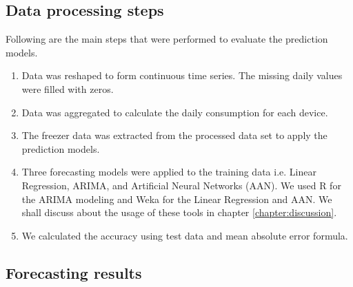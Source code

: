 \subsection{Data processing steps}
Following are the main steps that were performed to evaluate the prediction models.

\begin{enumerate}
\item Data was reshaped to form continuous time series. The missing daily values were filled with zeros.
\item Data was aggregated to calculate the daily consumption for each device.
\item  The freezer data was extracted from the processed data set to apply the prediction models.
\item  Three forecasting models were applied to the training data i.e. Linear Regression, ARIMA, and Artificial Neural Networks (AAN). We used R for the ARIMA modeling and Weka for the Linear Regression and AAN. We shall discuss about the usage of these tools in chapter \ref{chapter:discussion}. 
\item We calculated the accuracy using test data and mean absolute error formula.  
\end{enumerate} 

\subsection{Forecasting results}

